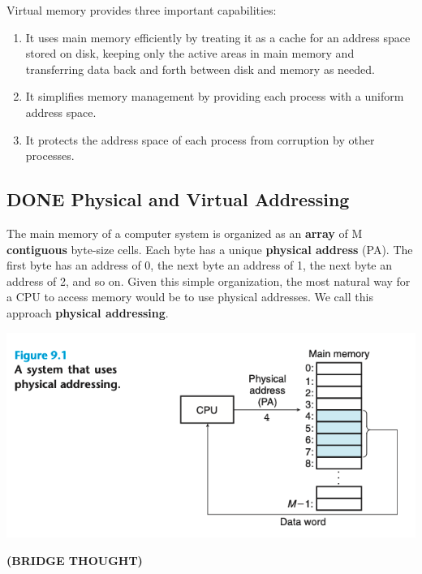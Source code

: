 \documentclass[11pt]{article}
\begin{document}
Virtual memory provides three important capabilities:\\
\begin{enumerate}
\item It uses main memory efficiently by treating it as a cache for an address space stored on disk, keeping only the active areas in main memory and transferring data back and forth between disk and memory as needed.\\
\item It simplifies memory management by providing each process with a uniform address space.\\
\item It protects the address space of each process from corruption by other processes.\\
\end{enumerate}


\subsection{{\bfseries\sffamily DONE} Physical and Virtual Addressing}
\label{sec:org1fb1325}
The main memory of a computer system is organized as an \textbf{array} of M \textbf{contiguous} byte-size cells. Each byte has a unique \textbf{physical address} (PA). The first byte has an address of 0, the next byte an address of 1, the next byte an address of 2, and so on. Given this simple organization, the most natural way for a CPU to access memory would be to use physical addresses. We call this approach \textbf{physical addressing}.\\

\begin{center}
\includegraphics[width=.9\linewidth]{pics/figure9.1-physical-addressing.png}
\end{center}


\textbf{(BRIDGE THOUGHT)}\\
\end{document}
